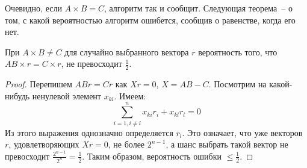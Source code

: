 Очевидно, если $A\times B=C$, алгоритм так и сообщит. Следующая теорема~-- о том, с какой вероятностью алгоритм ошибется, сообщив о равенстве, когда его нет.

\begin{theorem*}
    При $A\times B \neq C$ для случайно выбранного вектора $r$ вероятность того, что $AB\times r = C\times r$, не превосходит $\frac{1}{2}$.
\end{theorem*}
\begin{proof}
Перепишем $ABr = Cr$ как $Xr=0$, $X=AB-C$. Посмотрим на какой-нибудь ненулевой элемент $x_{kl}$. Имеем:
$$\sum_{i=1, i\ne l}^{n} x_{ki}r_i+x_{kl}r_l=0$$
Из этого выражения однозначно определяется $r_l$. Это означает, что уже векторов $r$, удовлетворяющих $Xr=0$, не более $2^{n-1}$, а шанс выбрать такой вектор не превосходит $\frac{2^{n-1}}{2^n} = \frac{1}{2}$. Таким образом, вероятность ошибки $\le\frac{1}{2}$. \end{proof}
